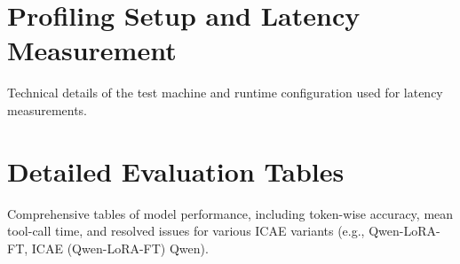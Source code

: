 \section{Profiling Setup and Latency Measurement}

Technical details of the test machine and runtime configuration used for latency measurements.


\section{Detailed Evaluation Tables}

Comprehensive tables of model performance, including token-wise accuracy, mean tool-call time, and resolved issues for various ICAE \cite{ge_-context_2024} variants (e.g., Qwen-LoRA-FT, ICAE (Qwen-LoRA-FT) Qwen).
